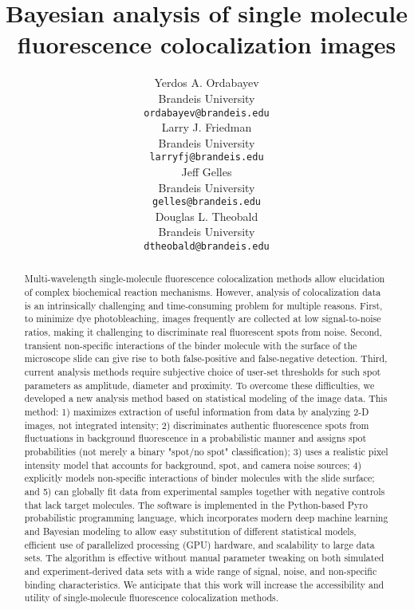 \documentclass{article}
\title{Bayesian analysis of single molecule fluorescence  colocalization images}
\author{
 Yerdos A. Ordabayev \\
  Brandeis University\\
  \texttt{ordabayev@brandeis.edu} \\
   \And
 Larry  J. Friedman \\
  Brandeis University\\
  \texttt{larryfj@brandeis.edu} \\
  \And
 Jeff Gelles \\
  Brandeis University\\
  \texttt{gelles@brandeis.edu} \\
  \And
 Douglas L. Theobald \\
  Brandeis University\\
  \texttt{dtheobald@brandeis.edu} \\
}
\begin{document}
\maketitle
\begin{abstract} %
Multi-wavelength single-molecule fluorescence colocalization methods allow elucidation of complex biochemical reaction mechanisms. However, analysis of colocalization data is an intrinsically challenging and time-consuming problem for multiple reasons. First, to minimize dye photobleaching, images frequently are collected at low signal-to-noise ratios, making it challenging to discriminate real fluorescent spots from noise. Second, transient non-specific interactions of the binder molecule with the surface of the microscope slide can give rise to both false-positive and false-negative detection. Third, current analysis methods require subjective choice of user-set thresholds for such spot parameters as amplitude, diameter and proximity. To overcome these difficulties, we developed a new analysis method based on statistical modeling of the image data. This method: 1) maximizes extraction of useful information from data by analyzing 2-D images, not integrated intensity; 2) discriminates authentic fluorescence spots from fluctuations in background fluorescence in a probabilistic manner and assigns spot probabilities (not merely a binary "spot/no spot" classification); 3) uses a realistic pixel intensity model that accounts for background, spot, and camera noise sources; 4) explicitly models non-specific interactions of binder molecules with the slide surface; and 5) can globally fit data from experimental samples together with negative controls that lack target molecules. The software is implemented in the Python-based Pyro probabilistic programming language, which incorporates modern deep machine learning and Bayesian modeling to allow easy substitution of different statistical models, efficient use of parallelized processing (GPU) hardware, and scalability to large data sets. The algorithm is effective without manual parameter tweaking on both simulated and experiment-derived data sets with a wide range of signal, noise, and non-specific binding characteristics. We anticipate that this work will increase the accessibility and utility of single-molecule fluorescence colocalization methods.
\end{abstract}  
\end{document}
